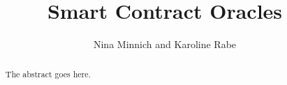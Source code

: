 \documentclass[conference]{IEEEtran}
\begin{document}
%
\title{Smart Contract Oracles}


\author{Nina Minnich and Karoline Rabe}


% 








\maketitle

\begin{abstract}
The abstract goes here.
\end{abstract}
\end{document}
